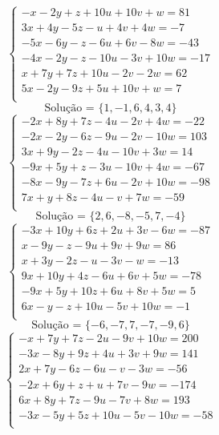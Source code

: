 \documentclass[12pt,oneside,a4paper]{article}
\begin{document}
\vspace{\baselineskip}
\begin{equation*}
\begin{cases}
-x-2y+z+10u+10v+w=81 \\
3x+4y-5z-u+4v+4w=-7 \\
-5x-6y-z-6u+6v-8w=-43 \\
-4x-2y-z-10u-3v+10w=-17 \\
x+7y+7z+10u-2v-2w=62 \\
5x-2y-9z+5u+10v+w=7 \\
\end{cases}
\end{equation*}
\begin{equation*}
\text{Solução = }\{1,-1,6,4,3,4\}
\end{equation*}
\vspace{\baselineskip}
\begin{equation*}
\begin{cases}
-2x+8y+7z-4u-2v+4w=-22 \\
-2x-2y-6z-9u-2v-10w=103 \\
3x+9y-2z-4u-10v+3w=14 \\
-9x+5y+z-3u-10v+4w=-67 \\
-8x-9y-7z+6u-2v+10w=-98 \\
7x+y+8z-4u-v+7w=-59 \\
\end{cases}
\end{equation*}
\begin{equation*}
\text{Solução = }\{2,6,-8,-5,7,-4\}
\end{equation*}
\vspace{\baselineskip}
\begin{equation*}
\begin{cases}
-3x+10y+6z+2u+3v-6w=-87 \\
x-9y-z-9u+9v+9w=86 \\
x+3y-2z-u-3v-w=-13 \\
9x+10y+4z-6u+6v+5w=-78 \\
-9x+5y+10z+6u+8v+5w=5 \\
6x-y-z+10u-5v+10w=-1 \\
\end{cases}
\end{equation*}
\begin{equation*}
\text{Solução = }\{-6,-7,7,-7,-9,6\}
\end{equation*}
\vspace{\baselineskip}
\begin{equation*}
\begin{cases}
-x+7y+7z-2u-9v+10w=200 \\
-3x-8y+9z+4u+3v+9w=141 \\
2x+7y-6z-6u-v-3w=-56 \\
-2x+6y+z+u+7v-9w=-174 \\
6x+8y+7z-9u-7v+8w=193 \\
-3x-5y+5z+10u-5v-10w=-58 \\
\end{cases}
\end{equation*}
\end{document}
